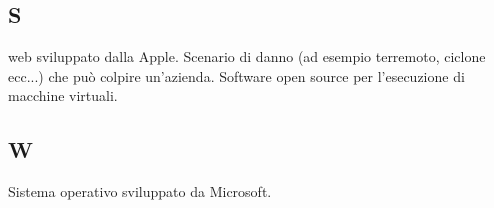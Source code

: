 	\subsection{S}
		 web sviluppato dalla Apple.
		Scenario di danno (ad esempio terremoto, ciclone ecc...) che può colpire un'azienda.
		Software open source per l'esecuzione di macchine virtuali.
	\subsection{W}
		Sistema operativo sviluppato da Microsoft.
